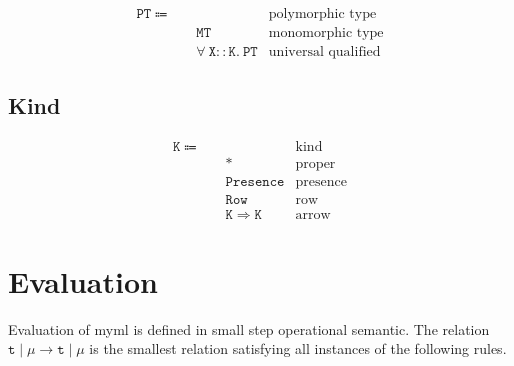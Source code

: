 \documentclass{report}
\newcommand{\theLang}{myml}
\newcommand{\code}{\mathtt}
\begin{document}
\begin{align*}
\code{PT} \Coloneqq\quad & & \text{polymorphic type} \\
& \code{MT} & \text{monomorphic type} \\
& \code{\forall\ X :: K.\ PT} & \text{universal qualified}
\end{align*}

\subsection{Kind}

\begin{align*}
\code{K} \Coloneqq \quad & & \text{kind} \\
& \code{*} & \text{proper} \\
& \code{Presence} & \text{presence} \\
& \code{Row} & \text{row} \\
& \code{K \Rightarrow K} & \text{arrow}
\end{align*}

\section{Evaluation}

Evaluation of \theLang{} is defined in small step operational semantic. The relation \(\code{t}\mid\mu \longrightarrow \code{t}\mid\mu\) is the smallest relation satisfying all instances of the following rules.
\end{document}
